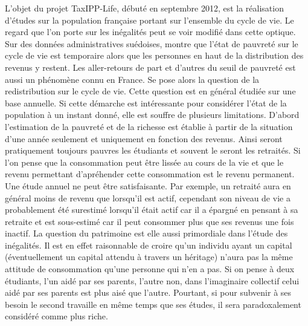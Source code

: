 L'objet du projet TaxIPP-Life, débuté en septembre 2012, est la réalisation d'études sur la population française portant sur l'ensemble du cycle de vie. Le regard que l'on porte sur les inégalités peut se voir modifié dans cette optique. Sur des données administratives suédoises, \cite{Bjorklund2011} montre que l'état de pauvreté sur le cycle de vie est temporaire alors que les personnes en haut de la distribution des revenus y restent. Les aller-retours de part et d'autres du seuil de pauvreté est aussi un phénomène connu en France. 
Se pose alors la question de la redistribution sur le cycle de vie. Cette question est en général étudiée sur une base annuelle. Si cette démarche est intéressante pour considérer l'état de la population à un instant donné, elle est souffre de plusieurs limitations. 
D'abord l'estimation de la pauvreté et de la richesse est établie à partir de la situation d'une année seulement et uniquement en fonction des revenus. Ainsi seront pratiquement toujours pauvres les étudiants et souvent le seront les retraités. Si l'on pense que la consommation peut être lissée au cours de la vie et que le revenu permettant d'apréhender cette consommation est le revenu permanent. Une étude annuel ne peut être satisfaisante. Par exemple, un retraité aura en général moins de revenu que lorsqu'il est actif, cependant son niveau de vie a probablement été surestimé lorsqu'il était actif car il a épargné en pensant à sa retraite et est sous-estimé car il peut consommer plus que ses revenus une fois inactif. 
La question du patrimoine est elle aussi primordiale dans l'étude des inégalités. Il est en effet raisonnable de croire qu'un individu ayant un capital (éventuellement un capital attendu à travers un héritage) n'aura pas la même attitude de consommation qu'une personne qui n'en a pas. Si on pense à deux étudiants, l'un aidé par ses parents, l'autre non, dans l'imaginaire collectif celui aidé par ses parents est plus aisé que l'autre. Pourtant, si pour subvenir à ses besoin le second travaille en même temps que ses études, il sera paradoxalement considéré comme plus riche.
 
